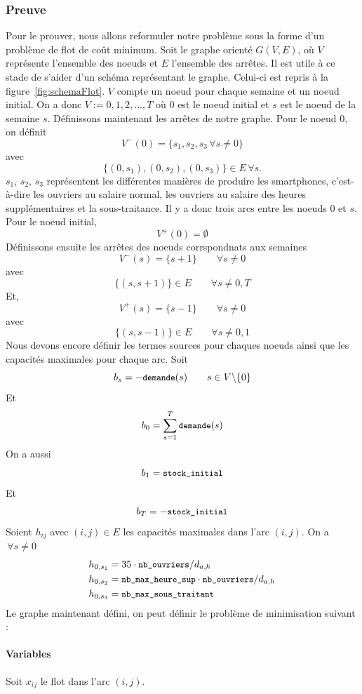 \documentclass[12pt,oneside,a4paper]{article}
\newcommand{\texttts}[1]{{\small\texttt{#1}}}
\begin{document}
\subsubsection*{Preuve}
Pour le prouver, nous allons reformuler notre problème sous la forme d'un problème de flot de coût minimum.
Soit le graphe orienté $G(V,E)$, 
où $V$ représente l'ensemble des noeuds et $E$ l'ensemble des arrêtes.
Il est utile à ce stade de s'aider d'un schéma représentant le graphe. 
Celui-ci est repris à la figure~\ref{fig:schemaFlot}.
$V$ compte un noeud pour chaque semaine et un noeud initial.
On a donc $V := {0, 1, 2, ..., T}$
où $0$ est le noeud initial et $s$ est le noeud de la semaine $s$.
Définissons maintenant les arrêtes de notre graphe.
Pour le noeud $0$, on définit 
\[ V^{-}(0) = \{s_1, s_2, s_3 \, \forall s \ne 0\} \]
avec
\[ \{(0, s_1), (0, s_2), (0, s_3)\} \in E \, \forall s. \]
$s_1$, $s_2$, $s_3$ représentent les différentes manières de produire les smartphones, c'est-à-dire les ouvriers au salaire normal, les ouvriers au salaire des heures supplémentaires et la sous-traitance.
Il y a donc trois arcs entre les noeuds $0$ et $s$.
Pour le noeud initial,
\[ V^{+}(0) = \emptyset \]
Définissons ensuite les arrêtes des noeuds corrspondnats aux semaines
\[ V^{-}(s) = \{s+1\} \qquad \forall s \ne 0 \]
avec 
\[ \{(s, s+1)\} \in E \qquad \forall s \ne 0, T \]
Et,
\[ V^{+}(s) = \{s-1\} \qquad \forall s \ne 0 \]
avec
\[ \{(s, s-1)\} \in E \qquad \forall s \ne 0, 1 \]
Nous devons encore définir les termes sources pour chaques noeuds ainsi que les capacités maximales pour chaque arc.
Soit
\[ b_s = - \texttts{demande}(s) \qquad s \in V \backslash \{0\} \]
Et 
\[ b_0 = \sum_{s=1}^{T} \texttts{demande}(s) \]  
On a aussi
\[ b_1 = \texttts{stock\_initial} \]
Et
\[ b_T = - \texttts{stock\_initial} \]
Soient $h_{ij}$ avec $(i, j) \in E$ les capacités maximales dans l'arc $(i, j)$.
On a $\, \forall s \ne 0$ 
\begin{align*}
  h_{0, s_1} &= 35\cdot \texttts{nb\_ouvriers}/ d_{a,h} \\
  h_{0, s_2} &= \texttts{nb\_max\_heure\_sup}\cdot\texttts{nb\_ouvriers}/ d_{a,h} \\
  h_{0, s_3} &= \texttts{nb\_max\_sous\_traitant} 
\end{align*}
Le graphe maintenant défini, 
on peut définir le problème de minimisation suivant :
\paragraph{Variables}
Soit $x_{ij}$ le flot dans l'arc $(i, j)$.
\end{document}
